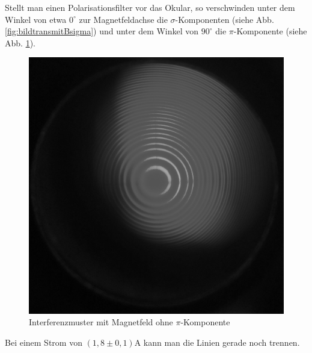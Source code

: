 Stellt man einen Polarisationsfilter vor das Okular, so verschwinden unter dem Winkel von etwa $0^\circ$ zur Magnetfeldachse die $\sigma$-Komponenten (siehe Abb. \ref{fig:bildtransmitBsigma}) und unter dem Winkel von $90^\circ$ die $\pi$-Komponente (siehe Abb. \ref{fig:bildtransmitBpi}).\\
\begin{figure}
\centering
\includegraphics[scale=0.1]{data/bilder_okular/bild_4_edit.jpg}
\caption{Interferenzmuster mit Magnetfeld ohne $\pi$-Komponente}
\label{fig:bildtransmitBpi}
\end{figure}
Bei einem Strom von $\si{(1,8\pm 0,1)\ampere}$ kann man die Linien gerade noch trennen.

